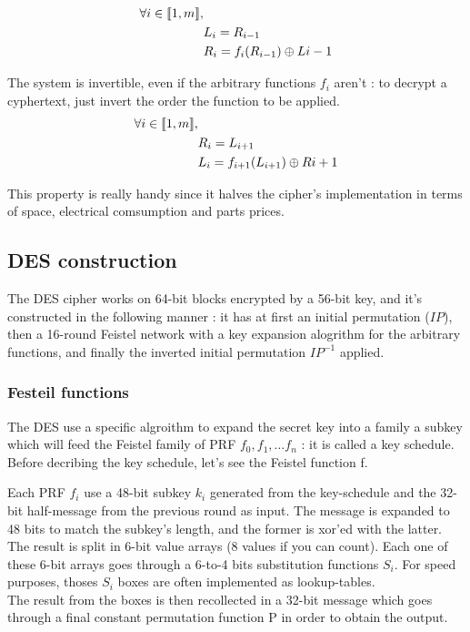\begin{mytheorem}
    \begin{align}
        \forall i \in \llbracket1,m\rrbracket,&                 \\
        &L_i = R_{i-1}                                          \\
        &R_i = f_i(R_{i-1}) \oplus L{i-1}                         
    \end{align}
\end{mytheorem}

The system is invertible, even if the arbitrary functions $f_i$ aren't : to decrypt a cyphertext, just invert the order the function to be applied. 
\begin{align}   
    \forall i \in \llbracket1,m\rrbracket,&                     \\
    &R_i = L_{i+1}                                              \\
    & L_i = f_{i+1}(L_{i+1}) \oplus R{i+1}                    
\end{align}

This property is really handy since it halves the cipher's implementation in terms of space, electrical comsumption and parts prices.

\subsection{ DES construction }

The DES cipher works on 64-bit blocks encrypted by a 56-bit key, and it's constructed in the following manner : it has at first an initial permutation ($IP$), then a 16-round Feistel network with a key expansion alogrithm for the arbitrary functions, and finally the inverted initial permutation $IP^{-1}$ applied.

\subsubsection{Festeil functions}

The DES use a specific algroithm to expand the secret key into a family a subkey which will feed the Feistel family of PRF $f_0,f_1,\dots f_n$ : it is called a key schedule. Before decribing the key schedule, let's see the Feistel function f. 

Each PRF $f_i$ use a 48-bit subkey $k_i$ generated from the key-schedule and the 32-bit half-message from the previous round as input. The message is expanded to 48 bits to match the subkey's length, and the former is xor'ed with the latter.\\
The result is split in 6-bit value arrays (8 values if you can count). Each one of these 6-bit arrays goes through a 6-to-4 bits substitution functions $S_i$. For speed purposes, thoses $S_i$ boxes are often implemented as lookup-tables. \\
The result from the boxes is then recollected in a 32-bit message which goes through a final constant permutation function P in order to obtain the output. \\

